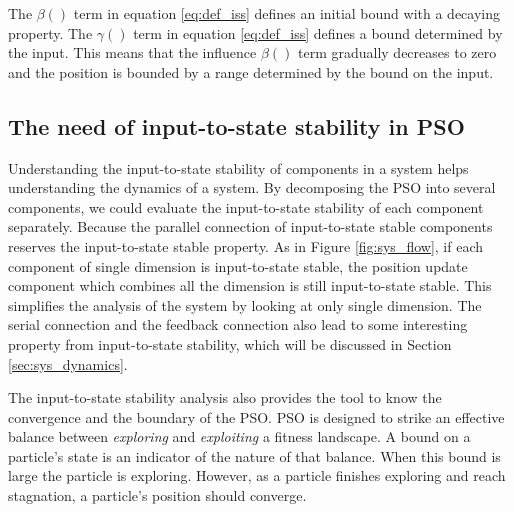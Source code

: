 \documentclass{sig-alternate}
\begin{document}
The $ \beta () $ term in equation \eqref{eq:def_iss} defines an initial bound with a decaying property.
The $ \gamma () $ term in equation \eqref{eq:def_iss} defines a bound determined by the input.
This means that the influence $ \beta () $ term gradually decreases to zero and the position is bounded by a range determined by the bound on the input.

\subsection{The need of input-to-state stability in PSO}

Understanding the input-to-state stability of components in a system helps understanding the dynamics of a system.
By decomposing the PSO into several components, we could evaluate the input-to-state stability of each component separately. 
Because the parallel connection of input-to-state stable components reserves the input-to-state stable property.
As in Figure \ref{fig:sys_flow}, if each component of single dimension is input-to-state stable,  the position update component which combines all the dimension is still input-to-state stable.
This simplifies the analysis of the system by looking at only single dimension.
The serial connection and the feedback connection also lead to some interesting property from input-to-state stability, which will be discussed in Section \ref{sec:sys_dynamics}.

The input-to-state stability analysis also provides the tool to know the convergence and the boundary of the PSO.
PSO is designed to strike an effective balance between \emph{exploring} and \emph{exploiting} a fitness landscape.
A bound on a particle's state is an indicator of the nature of that balance.
When this bound is large the particle is exploring.
However, as a particle finishes exploring and reach stagnation, a particle's position should converge.
\end{document}
